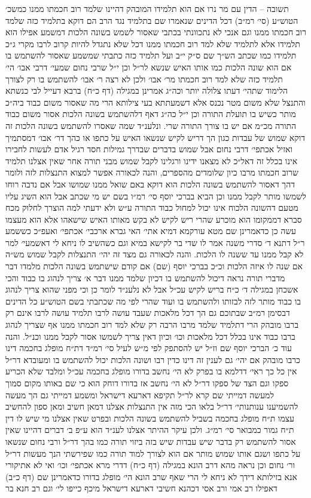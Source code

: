 \documentclass[12pt, openany]{book}
\begin{document}
\begin{multicols}{2}
תשובה – הדין עם מר נרו אם הוא תלמידו המובהק דהיינו שלמד רוב חכמתו ממנו כמשכ׳ הטוש״ע (סי׳ רמ״ב) דכל הדינים שנאמרו שם בתלמיד נגד הרב הם דוקא בתלמיד כזה שלמד רוב חכמתו ממנו וגם אנכי לא נתכוונתי בכתבי שאסור לשמש בשונה הלכות דמשמע אפילו הוא תלמידו אלא לתלמיד שלא למד רוב חכמתו ממנו דכל שלא נתגדל להיות קרוב לרבו מקרי ג״כ תלמידו כמו שכתב הש״ך שם ס״ק י״ב ועל תלמיד כזה כתבתי שמשמע שאסור להשתמש בו אם הוא שונה הלכות כמו אותו האיש שנשא לר״ל וכן י״ל שרבי נחום שמעי׳ דרבי אבו׳ הי׳ תלמיד כזה שלא למד רוב חכמתו מר׳ אבו׳ ולכן לא רצה ר׳ אבו׳ להשתמש בו רק לצורך הלימוד שתהי׳ דעתו צלולה יותר וכה״ג אמרינן במגילה (דף כ״ח) ברבא דעייל לבי כנשתא והתנצל שלא משום מטר נכנס אלא דשמעתתא בעי צילותא הרי מה שאסור משום כבוד ביה״כ מותר כשיש בו תועלת התורה וכן י״ל כה״ג דאף דלהשתמש בשונה הלכות אסור משום כבוד התורה מכ״מ אם יש בו צורך התורה שרי. ונלענ״ד שמה שאסרו להשתמש בשונה הלכות זה דוקא שמוש של עבדות כגון הך דריש לקיש שנשאו האיש על כתפו או כהך דר׳ אבו׳ דמסתמיך ואזיל אכתפי׳ דרבי נחום אבל שמוש בדברים שבדרך גמילות חסד רגיל אדם לעשות לחבירו אינו בכלל זה דאל״כ לא מצאנו ידינו ורגלינו לקבל שמוש מבני תורה אחר שאין אצלנו תלמיד שרוב חכמתו מרבו כיון שלומדים מהספרים, והנה לכאורה אפשר למצוא התנצלות לזה ולומר דהך דאסור להשתמש בשונה הלכות הוא דוקא באם שואל ממנו שמושו אבל אם נדבה רוחו לשמשו מותר לקבל ממנו וכן הביא בברכי יוסף סי׳ רמ״ו בשם יש מי שכתב אבל הוא השיג עליו מטעם דהשונה הלכוח אינו יכול למחול כבוד התורה ע״ש ולא ידעתי למה הוצרך לחלוק מכח סברא דממקומו הוא מוכרע שהרי ריש לקיש לא בקש מאותו האיש שישאהו אלא הוא מעצמו עשה כן כדאמרינן שם מטא עורקמא דמיא אתי׳ האי גברא ארכבי׳ אכתפי׳ ואעפ״כ כששמע ר״ל דתנא ד׳ סדרי משנה אמר לו שדי בר לקישא במיא וגם כשהשיב לו ניחא לי דאשמעי׳ למר לא קבל ממנו עד ששנה לו הלכות. והנה לכאורה גם מצד זה יהי׳ התנצלות לקבל שמוש מש״ה אם שנה לו איזה הלכות וכ״כ בברכי יוסף (שם) אם קודם שישתמש בשונה הלכות מלמדו דבר מדברי תורה נראה דיכול להשתמש בו דכיון שלמד ממנו דבר א׳ צריך לנהוג בו כבוד והכי אשכחן במגילה ד׳ כ״ח בריש לקיש עכ״ל אבל לא נלענ״ד לומר כן וכי מפני שהוא צריך לנהוג בו כבוד מותר לזה לבזותו ולהשתמש בו ועוד שהרי לפי מה שכתבתי בשם הטוש״ע כל הדינים דבסימן רמ״ב שבתוכם גם הך דכל מלאכות שעבד עושה לרבו תלמיד עושה לרבו אינם רק ברבו מובהק הרי דתלמיד שלמד מרבו הרבה רק שלא למד רוב חכמתו ממנו אף שצריך לנהוג ברבו כבוד אינו בכלל דכל מלאכות וכו׳ וכיון דאין צריך לשמשו אסור לקבל ממנו וכנ״ל. והנה עוד כ׳ הברכי יוסף שם וז״ל יש להסתפק לפי מ״ש לעיל סי׳ רמ״ד דת״ח מופלג בחכמה דינו כרבו מובהק אם יהי׳ גם לענין זה דינו כדין רבו ושונה הלכות יכול להשתמש בו ומעובדא דר״ל אין כל כך ראי׳ דדלמא בו בפרק לא הי׳ נחשב בדורו מופלג בחכמה עכ״ל ומלבד שלא הכריע ספקו וגם הצד של ספקו דר״ל לא הי׳ נחשב אז בדורו דוחק הוא כי שם באותו מקום סמוך למעשה דמייתי שם קרא לר״ל תקיפא דארעא דישראל ומשמע דמייתי גם הך מעשה להשמיענו ענותנותי׳ דר״ל בלאו הכי מזה אין התנצלות אצלנו דמאן חשיב ומאן ספון להחשיב עצמו ת״ח מופלג בחכמה בשביל להשתמש בשונה הלכות ובפרט שאין אצלנו מי שיש לו דין ת״ח גמור כמבואר סי׳ רמ״ג. ולכן עיקר ההיתר אצלנו לענ״ד הוא ע״פ ב׳ דברים דהיינו שאין אסור להשתמש רק בדבר שיש עבדות שיש בזה ביזוי תורה כמו בהך דר״ל ורבי נחום שנשאו על כתפו ושגם אותו שמוש מותר אם הוא לצורך למוד תורה כמו שפירשתי הנך מעשות דר״ל ור׳ נחום וכן נראה מהא דרב הונא במגילה (דף כ״ח) דדרי מרא אכתפי׳ וכו׳ ואי לא אתיקורי אנא בזילותא דידך לא ניחא לי הרי שאף שרב הונא הי׳ מופלג בדורו כדאמרינן שם (דף כ״ב) דאפילו רב אמי ורב אסי דכהנא חשיבי דארעא דישראל מיכף כייפו לי׳ וגם רב חנא בר 
\end{multicols}
\end{document}
